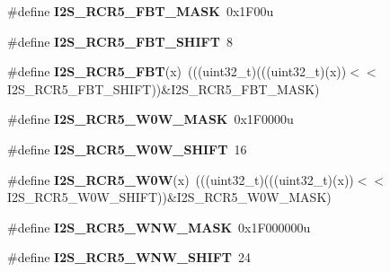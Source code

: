 \begin{DoxyCompactItemize}
\item 
\#define {\bfseries I2\+S\+\_\+\+R\+C\+R5\+\_\+\+F\+B\+T\+\_\+\+M\+A\+SK}~0x1\+F00u\hypertarget{group__I2S__Register__Masks_ga54847f1139b421f0f0df7af775a11996}{}\label{group__I2S__Register__Masks_ga54847f1139b421f0f0df7af775a11996}

\item 
\#define {\bfseries I2\+S\+\_\+\+R\+C\+R5\+\_\+\+F\+B\+T\+\_\+\+S\+H\+I\+FT}~8\hypertarget{group__I2S__Register__Masks_gabe8f4784a8f4ce3235e31483d0b6e5f4}{}\label{group__I2S__Register__Masks_gabe8f4784a8f4ce3235e31483d0b6e5f4}

\item 
\#define {\bfseries I2\+S\+\_\+\+R\+C\+R5\+\_\+\+F\+BT}(x)~(((uint32\+\_\+t)(((uint32\+\_\+t)(x))$<$$<$I2\+S\+\_\+\+R\+C\+R5\+\_\+\+F\+B\+T\+\_\+\+S\+H\+I\+FT))\&I2\+S\+\_\+\+R\+C\+R5\+\_\+\+F\+B\+T\+\_\+\+M\+A\+SK)\hypertarget{group__I2S__Register__Masks_ga833530d170a05c8c6e3812b44bd01bc4}{}\label{group__I2S__Register__Masks_ga833530d170a05c8c6e3812b44bd01bc4}

\item 
\#define {\bfseries I2\+S\+\_\+\+R\+C\+R5\+\_\+\+W0\+W\+\_\+\+M\+A\+SK}~0x1\+F0000u\hypertarget{group__I2S__Register__Masks_ga21ac7b9671ee42b3ff23e61fbc762bd6}{}\label{group__I2S__Register__Masks_ga21ac7b9671ee42b3ff23e61fbc762bd6}

\item 
\#define {\bfseries I2\+S\+\_\+\+R\+C\+R5\+\_\+\+W0\+W\+\_\+\+S\+H\+I\+FT}~16\hypertarget{group__I2S__Register__Masks_ga1b13ac40203b26b4adeb037896cbb88e}{}\label{group__I2S__Register__Masks_ga1b13ac40203b26b4adeb037896cbb88e}

\item 
\#define {\bfseries I2\+S\+\_\+\+R\+C\+R5\+\_\+\+W0W}(x)~(((uint32\+\_\+t)(((uint32\+\_\+t)(x))$<$$<$I2\+S\+\_\+\+R\+C\+R5\+\_\+\+W0\+W\+\_\+\+S\+H\+I\+FT))\&I2\+S\+\_\+\+R\+C\+R5\+\_\+\+W0\+W\+\_\+\+M\+A\+SK)\hypertarget{group__I2S__Register__Masks_gaf0bbc5e0cd36dc9f547c58d21dcd98e5}{}\label{group__I2S__Register__Masks_gaf0bbc5e0cd36dc9f547c58d21dcd98e5}

\item 
\#define {\bfseries I2\+S\+\_\+\+R\+C\+R5\+\_\+\+W\+N\+W\+\_\+\+M\+A\+SK}~0x1\+F000000u\hypertarget{group__I2S__Register__Masks_gab6d2caff41f65c7c2c24510803d8000f}{}\label{group__I2S__Register__Masks_gab6d2caff41f65c7c2c24510803d8000f}

\item 
\#define {\bfseries I2\+S\+\_\+\+R\+C\+R5\+\_\+\+W\+N\+W\+\_\+\+S\+H\+I\+FT}~24\hypertarget{group__I2S__Register__Masks_gade327b408882d6b24c668c4d7d4c52c8}{}\label{group__I2S__Register__Masks_gade327b408882d6b24c668c4d7d4c52c8}


\end{DoxyCompactItemize}

